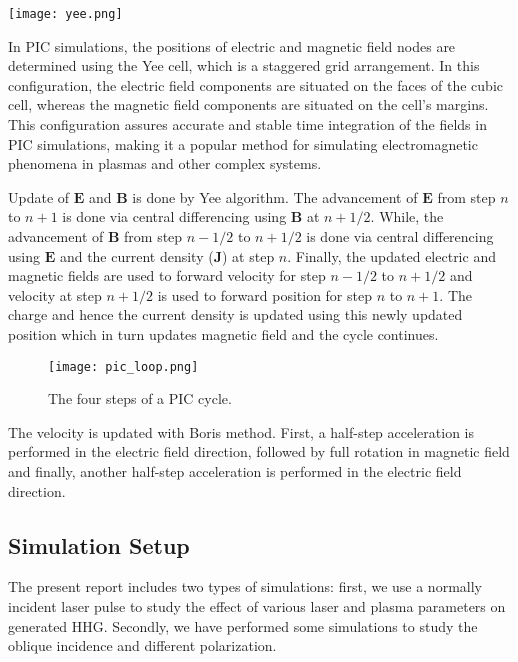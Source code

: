 \begin{minipage}{0.55\textwidth}\raggedright
    \texttt{[image: yee.png]}
\end{minipage}
\begin{minipage}{0.40\textwidth}\raggedright
    In PIC simulations, the positions of electric and magnetic field nodes are determined using the Yee cell, which is a staggered grid arrangement. In this configuration, the electric field components are situated on the faces of the cubic cell, whereas the magnetic field components are situated on the cell's margins. This configuration assures accurate and stable time integration of the fields in PIC simulations, making it a popular method for simulating electromagnetic phenomena in plasmas and other complex systems.
\end{minipage}

Update of $\mathbf{E}$ and $\mathbf{B}$ is done by Yee algorithm. The advancement of $\mathbf{E}$ from step $n$ to $n+1$ is done via central differencing using $\mathbf{B}$ at $n+1/2$. While, the advancement of $\mathbf{B}$ from step $n-1/2$ to $n+1/2$ is done via central differencing using $\mathbf{E}$ and the current density ($\textbf{J}$) at step $n$. Finally, the updated electric and magnetic fields are used to forward velocity for step $n-1/2$ to $n+1/2$ and velocity at step $n+1/2$ is used to forward position for step $n$ to $n+1$. The charge and hence the current density is updated using this newly updated position which in turn updates magnetic field and the cycle continues.

\begin{figure}[H]
    \centering
    \texttt{[image: pic\_loop.png]}
    \caption{The four steps of a PIC cycle.}
    \label{fig:pic-loop}
\end{figure}

The velocity is updated with Boris method. First, a half-step acceleration is performed in the electric field direction, followed by full rotation in magnetic field and finally, another half-step acceleration is performed in the electric field direction.

\subsection{Simulation Setup}
The present report includes two types of simulations: first, we use a normally incident laser pulse to study the effect of various laser and plasma parameters on generated HHG. Secondly, we have performed some simulations to study the oblique incidence and different polarization.

